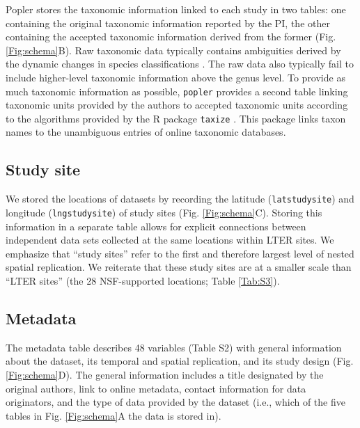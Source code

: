 \documentclass{article}\usepackage[]{graphicx}\usepackage[]{color}
\begin{document}
Popler stores the taxonomic information linked to each study in two tables: one containing the original taxonomic information reported by the PI, the other containing the accepted taxonomic information derived from the former (Fig. \ref{Fig:schema}B). Raw taxonomic data typically contains ambiguities derived by the dynamic changes in species classifications \citep{Chamberlain2013}. The raw data also typically fail to include higher-level taxonomic information above the genus level. To provide as much taxonomic information as possible, \texttt{popler} provides a second table linking taxonomic units provided by the authors to accepted taxonomic units according to the algorithms provided by the R package \texttt{taxize} \citep{Chamberlain2013}. This package links taxon names to the unambiguous entries of online taxonomic databases.

\subsection*{Study site}
We stored the locations of datasets by recording the latitude (\texttt{lat\textunderscore study\textunderscore site}) and longitude (\texttt{lng\textunderscore study\textunderscore site}) of study sites (Fig. \ref{Fig:schema}C). Storing this information in a separate table allows for explicit connections between independent data sets collected at the same locations within LTER sites. We emphasize that ``study sites'' refer to the first and therefore largest level of nested spatial replication. We reiterate that these study sites are at a smaller scale than ``LTER sites'' (the 28 NSF-supported locations; Table \ref{Tab:S3}).

\subsection*{Metadata}
The metadata table describes 48 variables (Table S2) with general information about the dataset, its temporal and spatial replication, and its study design (Fig. \ref{Fig:schema}D). The general information includes a title designated by the original authors, link to online metadata, contact information for data originators, and the type of data provided by the dataset (i.e., which of the five tables in Fig. \ref{Fig:schema}A the data is stored in).
\end{document}
